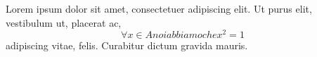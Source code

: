 \documentclass[a4paper,12pt]{article}
\begin{document}

Lorem ipsum dolor sit amet, consectetuer adipiscing elit. Ut purus elit, vestibulum ut, placerat ac, 
\begin{displaymath}
	\forall x \in A noi abbiamo che x^2 =1  
\end{displaymath}
adipiscing vitae, felis. Curabitur dictum gravida mauris.




% 





% 





% 
\end{document}
